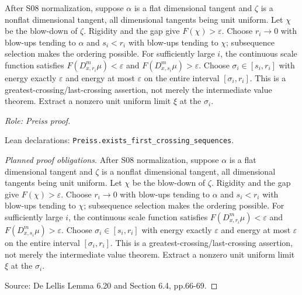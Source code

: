 \begin{lemma}
\label{lem:first-crossing}




After S08 normalization, suppose $\alpha$ is a flat dimensional tangent and
$\zeta$ is a nonflat dimensional tangent, all dimensional tangents being unit
uniform. Let $\chi$ be the blow-down of $\zeta$. Rigidity and the gap give
$F(\chi)>\varepsilon$. Choose $r_i\to0$ with blow-ups tending to $\alpha$
and $s_i<r_i$ with blow-ups tending to $\chi$; subsequence selection makes
the ordering possible. For sufficiently large $i$, the continuous scale
function satisfies $F(D_{x,r_i}^m\mu)<\varepsilon$ and
$F(D_{x,s_i}^m\mu)>\varepsilon$.
Choose $\sigma_i\in[s_i,r_i]$ with energy exactly $\varepsilon$ and energy
at most $\varepsilon$ on the entire interval $[\sigma_i,r_i]$.
This is a greatest-crossing/last-crossing assertion, not merely the intermediate
value theorem. Extract a nonzero unit uniform limit $\xi$ at the $\sigma_i$.
\par\emph{Role: Preiss proof.}
\par Lean declarations: \texttt{Preiss.exists\_first\_crossing\_sequences}.
\end{lemma}
\begin{proof}[Planned proof obligations]

After S08 normalization, suppose $\alpha$ is a flat dimensional tangent and
$\zeta$ is a nonflat dimensional tangent, all dimensional tangents being unit
uniform. Let $\chi$ be the blow-down of $\zeta$. Rigidity and the gap give
$F(\chi)>\varepsilon$. Choose $r_i\to0$ with blow-ups tending to $\alpha$
and $s_i<r_i$ with blow-ups tending to $\chi$; subsequence selection makes
the ordering possible. For sufficiently large $i$, the continuous scale
function satisfies $F(D_{x,r_i}^m\mu)<\varepsilon$ and
$F(D_{x,s_i}^m\mu)>\varepsilon$.
Choose $\sigma_i\in[s_i,r_i]$ with energy exactly $\varepsilon$ and energy
at most $\varepsilon$ on the entire interval $[\sigma_i,r_i]$.
This is a greatest-crossing/last-crossing assertion, not merely the intermediate
value theorem. Extract a nonzero unit uniform limit $\xi$ at the $\sigma_i$.
\par Source: De Lellis Lemma 6.20 and Section 6.4, pp.66-69.
\end{proof}

